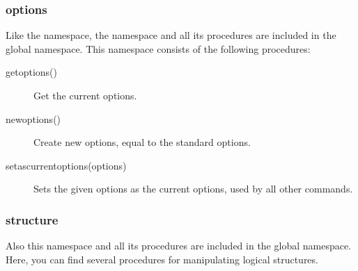 \subsubsection{options}
Like the  namespace, the  namespace and all its procedures are included in the global namespace. This namespace consists of the following procedures:

\begin{description}
	\item[getoptions()]
 		Get the current options.
	\item[newoptions()]
 		Create new options, equal to the standard options.
	\item[setascurrentoptions(options)]
 		Sets the given options as the current options, used by all other commands.
\end{description}

\subsubsection{structure}
Also this  namespace and all its procedures are included in the global namespace. Here, you can find several procedures for manipulating logical structures.

